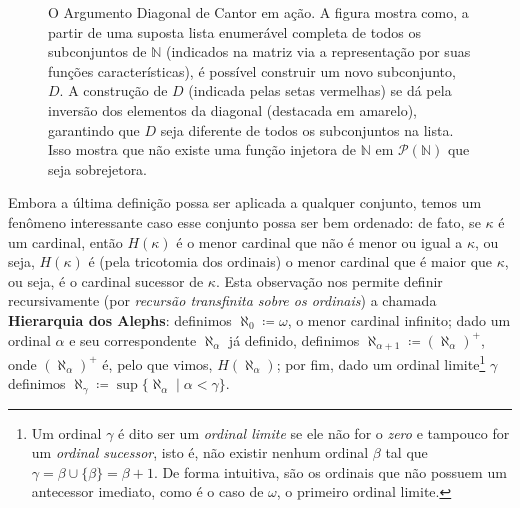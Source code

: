 \documentclass{hipatia}
\begin{document}
\begin{figure}[htb!]
\begin{center}
\end{center}
\caption{O Argumento Diagonal de Cantor em ação. A figura mostra como, a partir 
de uma suposta lista enumerável completa de todos os
 subconjuntos de $\mathbb{N}$ (indicados na matriz via
 a representação por suas funções características), 
é possível construir um novo subconjunto, $D$. A construção de $D$ (indicada 
pelas setas vermelhas) se dá pela inversão dos elementos da diagonal (destacada 
em amarelo), garantindo que $D$ seja diferente de todos os subconjuntos na lista.
Isso mostra que não existe uma função injetora de $\mathbb{N}$ 
em $\mathcal{P}(\mathbb{N})$ que seja sobrejetora.
}
\end{figure}

Embora a última definição possa ser aplicada a qualquer
conjunto, temos um fenômeno interessante caso esse conjunto
possa ser bem ordenado: de fato, se $\kappa$ é um cardinal,
então $H(\kappa)$ é o menor cardinal que não é menor ou
igual a $\kappa$, ou seja, $H(\kappa)$ é (pela tricotomia
dos ordinais) o menor cardinal que é maior que $\kappa$, ou
seja, é o cardinal sucessor de $\kappa$. Esta observação nos
permite definir recursivamente (por {\it recursão
transfinita sobre os ordinais}) a chamada {\bf Hierarquia
dos Alephs}: definimos $\aleph_0\coloneq\omega$, o menor cardinal infinito; dado um ordinal $\alpha$ e seu correspondente
$\aleph_\alpha$ já definido, definimos
$\aleph_{\alpha+1}\coloneq{\left(\aleph_\alpha\right)}^{+}$, onde
${\left(\aleph_\alpha\right)}^{+}$ é, pelo que vimos,
$H(\aleph_\alpha)$; por fim, dado um 
ordinal limite\footnote{Um ordinal $\gamma$ é dito ser um \textit{ordinal limite} se ele não for o {\it zero} e tampouco for um \textit{ordinal sucessor}, isto é, não existir nenhum ordinal $\beta$ tal que $\gamma = \beta \cup \{\beta\} = \beta + 1$. De forma intuitiva, são os ordinais que não possuem um antecessor imediato, como é o caso de $\omega$, o primeiro ordinal limite.}
$\gamma$
definimos
$\aleph_\gamma\coloneq\sup{\{\aleph_\alpha\mid\alpha<\gamma\}}$.
\end{document}
